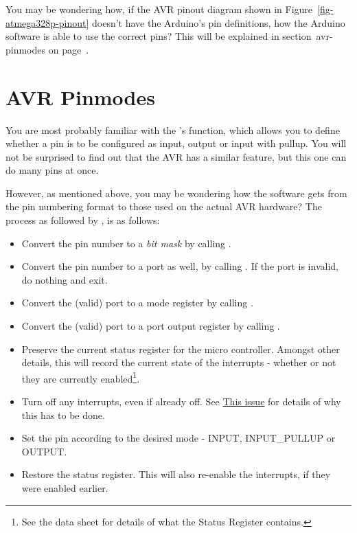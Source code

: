 You may be wondering how, if the AVR pinout diagram shown in Figure~\ref{fig-atmega328p-pinout} doesn't have the Arduino's pin definitions, how the Arduino software is able to use the correct pins? This will be explained in section~\refname{avr-pinmodes} on page~\pageref{avr-pinmodes}.

\section{AVR Pinmodes}\label{avr-pinmodes}

You are most probably familiar with the 's  function, which allows you to define whether a pin is to be configured as input, output or input with pullup. You will not be surprised to find out that the AVR has a similar feature, but this one can do many pins at once.

However, as mentioned above, you may be wondering how the   software gets from the  pin numbering format to those used on the actual AVR hardware? The process  as followed by , is as follows:

\begin{itemize}
	\item Convert the pin number to a \emph{bit mask} by calling .
	\item Convert the pin number to a port as well, by calling . If the port is invalid, do nothing and exit.
	\item Convert the (valid) port to a mode register by calling .
	\item Convert the (valid) port to a port output register by calling .
	\item Preserve the current status register for the micro controller. Amongst other details, this will record the current state of the interrupts - whether or not they are currently enabled\footnote{See the data sheet for details of what the Status Register contains.}.
	\item Turn off any interrupts, even if already off. See \href{http://code.google.com/p/arduino/issues/detail?id=146}{This issue} for details of why this has to be done.
	\item Set the pin according to the desired mode - INPUT, INPUT\_PULLUP or OUTPUT.
	\item Restore the status register. This will also re-enable the interrupts, if they were enabled earlier.
\end{itemize}

